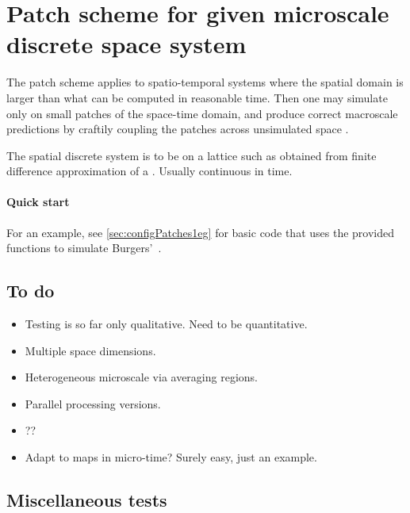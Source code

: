 \section{Patch scheme for given microscale discrete space system}
\label{sec:patch}
\secttoc

The patch scheme applies to spatio-temporal systems where
the spatial domain is larger than what can be computed in
reasonable time. Then one may simulate only on small patches
of the space-time domain, and produce correct macroscale
predictions by craftily coupling the patches across
unsimulated space \cite[e.g.]{Hyman2005, Samaey03b,
Samaey04, Roberts06d, Liu2015}.

The spatial discrete system is to be on a lattice such as
obtained from finite difference approximation of a \pde.
Usually continuous in time.

\paragraph{Quick start}
For an example, see \cref{sec:configPatches1eg} for basic code that uses the provided functions to simulate Burgers'~\pde.









\subsection{To do}
\begin{itemize}
\item Testing is so far only qualitative.  Need to be quantitative.
\item Multiple space dimensions.
\item Heterogeneous microscale via averaging regions.
\item Parallel processing versions.
\item ??
\item Adapt to maps in micro-time?  Surely easy, just an example.
\end{itemize}


\subsection{Miscellaneous tests}

